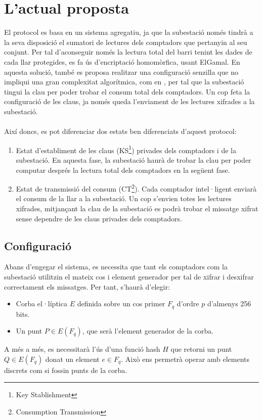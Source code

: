 \documentclass{article}
\begin{document}
\section{L'actual proposta}
El protocol \cite{recsi} es basa en un sistema agregatiu, ja que la subestació només tindrà a la seva disposició el sumatori de lectures dels comptadors que pertanyin al seu conjunt. Per tal d'aconseguir només la lectura total del barri tenint les dades de cada llar protegides, es fa ús d'encriptació homomòrfica, usant ElGamal.
En aquesta solució, també es proposa realitzar una configuració senzilla que no impliqui una gran complexitat algorítmica, com en \cite{busom}, per tal que la subestació tingui la clau per poder trobar el consum total dels comptadors. Un cop feta la configuració de les claus, ja només queda l'enviament de les lectures xifrades a la subestació.
\\\\
Així doncs, es pot diferenciar dos estats ben diferenciats d'aquest protocol:
\begin{enumerate}
\item Estat d'establiment de les claus (KS\footnote{Key Stablishment}) privades dels comptadors i de la subestació. En aquesta fase, la subestació haurà de trobar la clau per poder computar després la lectura total dels comptadors en la següent fase.
\item Estat de transmissió del consum (CT\footnote{Consumption Transmission}). Cada comptador intel·ligent enviarà el consum de la llar a la subestació. Un cop s'envien totes les lectures xifrades, mitjançant la clau de la subestació es podrà trobar el missatge xifrat sense dependre de les claus privades dels comptadors. 
\end{enumerate}
\subsection{Configuració}
Abans d'engegar el sistema, es necessita que tant els comptadors com la subestació utilitzin el mateix cos i element generador per tal de xifrar i desxifrar correctament els missatges. Per tant, s'haurà d'elegir:
\begin{itemize}
	\item Corba el·líptica $E$ definida sobre un cos primer $F_q$ d'ordre $p$ d'almenys 256 bits.
	\item Un punt $P \in E(F_q)$, que serà l'element generador de la corba.
\end{itemize}
A més a més, es necessitarà l'ús d'una funció hash %
$H$ que retorni un punt $Q \in E(F_q)$ donat un element $e \in F_q$. Això ens permetrà operar amb elements discrets com si fossin punts de la corba. 
\end{document}
